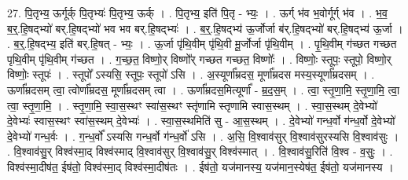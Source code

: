 \documentclass[17pt]{extarticle}
\begin{document}
27. पि॒तृभ्य॒ ऊर्गूर्क् पि॒तृभ्यः॑ पि॒तृभ्य॒ ऊर्क् । . पि॒तृभ्य॒ इति॑ पि॒तृ - भ्यः॒ । . ऊर्ग् भ॑व भ॒वोर्गूर्ग् भ॑व । . भ॒व॒ ब॒र्॒.हि॒षद्भ्यो॑ बर्.हि॒षद्भ्यो॑ भव भव बर्.हि॒षद्भ्यः॑ । . ब॒र्॒.हि॒षद्भ्य॑ ऊ॒र्जोर्जा ब॑र्.हि॒षद्भ्यो॑ बर्.हि॒षद्भ्य॑ ऊ॒र्जा । . ब॒र्॒.हि॒षद्भ्य॒ इति॑ बर्.हि॒षत् - भ्यः॒ । . ऊ॒र्जा पृ॑थि॒वीम् पृ॑थि॒वी मू॒र्जोर्जा पृ॑थि॒वीम् । . पृ॒थि॒वीम् ग॑च्छत गच्छत पृथि॒वीम् पृ॑थि॒वीम् ग॑च्छत । . ग॒च्छ॒त॒ विष्णो॒र् विष्णो᳚र् गच्छत गच्छत॒ विष्णोः᳚ । . विष्णोः॒ स्तूपः॒ स्तूपो॒ विष्णो॒र् विष्णोः॒ स्तूपः॑ । . स्तूपो᳚ ऽस्यसि॒ स्तूपः॒ स्तूपो॑ ऽसि । . अ॒स्यूर्णा᳚म्रदस॒ मूर्णा᳚म्रदस मस्य॒स्यूर्णा᳚म्रदसम् । . ऊर्णा᳚म्रदसम् त्वा॒ त्वोर्णा᳚म्रदस॒ मूर्णा᳚म्रदसम् त्वा । . ऊर्णा᳚म्रदस॒मित्यूर्णा᳚ - म्र॒द॒स॒म् । . त्वा॒ स्तृ॒णा॒मि॒ स्तृ॒णा॒मि॒ त्वा॒ त्वा॒ स्तृ॒णा॒मि॒ । . स्तृ॒णा॒मि॒ स्वा॒स॒स्थꣳ स्वा॑स॒स्थꣳ स्तृ॑णामि स्तृणामि स्वास॒स्थम् । . स्वा॒स॒स्थम् दे॒वेभ्यो॑ दे॒वेभ्यः॑ स्वास॒स्थꣳ स्वा॑स॒स्थम् दे॒वेभ्यः॑ । . स्वा॒स॒स्थमिति॑ सु - आ॒स॒स्थम् । . दे॒वेभ्यो॑ गन्ध॒र्वो ग॑न्ध॒र्वो दे॒वेभ्यो॑ दे॒वेभ्यो॑ गन्ध॒र्वः । . ग॒न्ध॒र्वो᳚ ऽस्यसि गन्ध॒र्वो ग॑न्ध॒र्वो॑ ऽसि । . अ॒सि॒ वि॒श्वाव॑सुर् वि॒श्वाव॑सुरस्यसि वि॒श्वाव॑सुः । . वि॒श्वाव॑सु॒र् विश्व॑स्मा॒द् विश्व॑स्माद् वि॒श्वाव॑सुर् वि॒श्वाव॑सु॒र् विश्व॑स्मात् । . वि॒श्वाव॑सु॒रिति॑ वि॒श्व - व॒सुः॒ । . विश्व॑स्मा॒दीष॑त॒ ईष॑तो॒ विश्व॑स्मा॒द् विश्व॑स्मा॒दीष॑तः । . ईष॑तो॒ यज॑मानस्य॒ यज॑मान॒स्येष॑त॒ ईष॑तो॒ यज॑मानस्य । \newline
\end{document}
